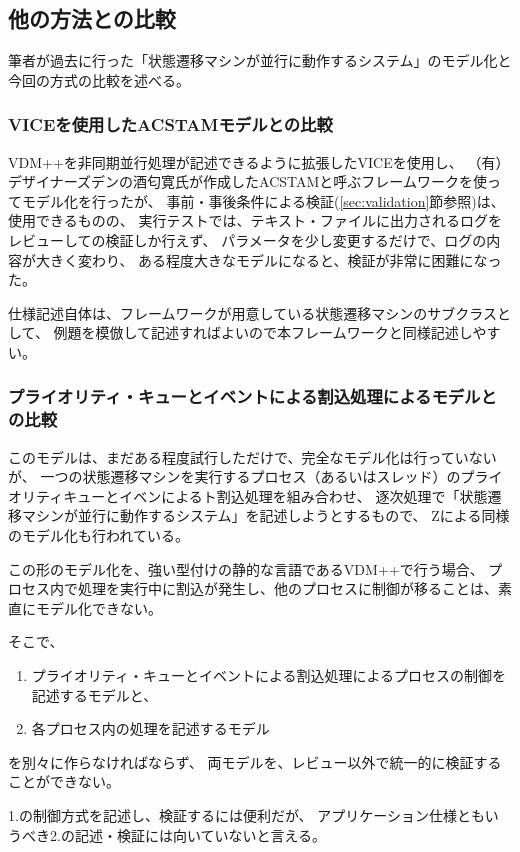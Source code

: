 \documentclass[a4paper,8pt]{jsarticle}
\begin{document}
\subsection {他の方法との比較}
\label{sec:otherMethod}
筆者が過去に行った「状態遷移マシンが並行に動作するシステム」のモデル化と今回の方式の比較を述べる。

\subsubsection{VICE\cite{CSKVICE}を使用したACSTAMモデルとの比較}
VDM++を非同期並行処理が記述できるように拡張したVICEを使用し、
（有）デザイナーズデンの酒匂寛氏が作成したACSTAMと呼ぶフレームワークを使ってモデル化を行ったが、
事前・事後条件による検証(\ref{sec:validation}節参照)は、使用できるものの、
実行テストでは、テキスト・ファイルに出力されるログをレビューしての検証しか行えず、
パラメータを少し変更するだけで、ログの内容が大きく変わり、
ある程度大きなモデルになると、検証が非常に困難になった。

仕様記述自体は、フレームワークが用意している状態遷移マシンのサブクラスとして、
例題を模倣して記述すればよいので本フレームワークと同様記述しやすい。


\subsubsection{プライオリティ・キューとイベントによる割込処理によるモデルとの比較}
このモデルは、まだある程度試行しただけで、完全なモデル化は行っていないが、
一つの状態遷移マシンを実行するプロセス（あるいはスレッド）のプライオリティキューとイベンによるト割込処理を組み合わせ、
逐次処理で「状態遷移マシンが並行に動作するシステム」を記述しようとするもので、
Zによる同様のモデル化\cite{Craig2007}も行われている。

この形のモデル化を、強い型付けの静的な言語であるVDM++で行う場合、
プロセス内で処理を実行中に割込が発生し、他のプロセスに制御が移ることは、素直にモデル化できない。

そこで、
\begin{enumerate}
	\item プライオリティ・キューとイベントによる割込処理によるプロセスの制御を記述するモデルと、
	\item 各プロセス内の処理を記述するモデル
\end{enumerate}
を別々に作らなければならず、
両モデルを、レビュー以外で統一的に検証することができない。

1.の制御方式を記述し、検証するには便利だが、
アプリケーション仕様ともいうべき2.の記述・検証には向いていないと言える。
\end{document}
